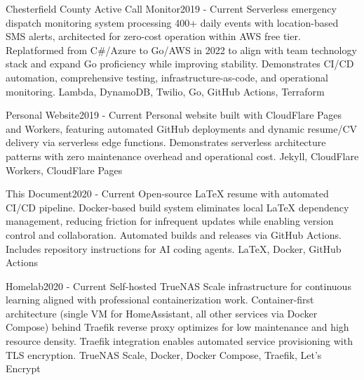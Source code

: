 \begin{projects}
    \project
    {Chesterfield County Active Call Monitor}{2019 - Current}
    {}
    {Serverless emergency dispatch monitoring system processing 400+ daily
    events with location-based SMS alerts, architected for zero-cost operation
    within AWS free tier. Replatformed from C\#/Azure to Go/AWS in 2022 to align
    with team technology stack and expand Go proficiency while improving
    stability. Demonstrates CI/CD automation, comprehensive testing,
    infrastructure-as-code, and operational monitoring.}
    {Lambda, DynamoDB, Twilio, Go, GitHub Actions, Terraform}

    \ifcv
    \project
    {Personal Website}{2019 - Current}
    {}
    {Personal website built with CloudFlare Pages and Workers, featuring
    automated GitHub deployments and dynamic resume/CV delivery via serverless
    edge functions. Demonstrates serverless architecture patterns with zero
    maintenance overhead and operational cost.}
    {Jekyll, CloudFlare Workers, CloudFlare Pages}
    \fi

    \project
    {This Document}{2020 - Current}
    {\thislink{\website}}
    {Open-source LaTeX resume with automated CI/CD pipeline. Docker-based build
    system eliminates local LaTeX dependency management, reducing friction for
    infrequent updates while enabling version control and collaboration.
    Automated builds and releases via GitHub Actions. Includes repository
    instructions for AI coding agents.}
    {\LaTeX, Docker, GitHub Actions}

    \ifcv
    \project
    {Homelab}{2020 - Current}
    {}
    {Self-hosted TrueNAS Scale infrastructure for continuous learning aligned
    with professional containerization work. Container-first architecture
    (single VM for HomeAssistant, all other services via Docker Compose) behind
    Traefik reverse proxy optimizes for low maintenance and high resource
    density. Traefik integration enables automated service provisioning with TLS
    encryption.}
    {TrueNAS Scale, Docker, Docker Compose, Traefik, Let's Encrypt}
    \fi
\end{projects}
